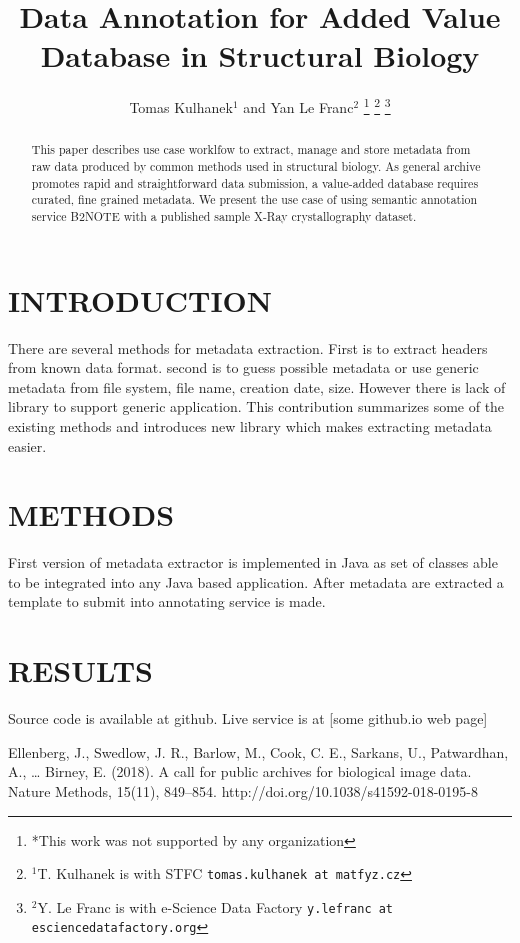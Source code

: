 \documentclass[letterpaper, 10 pt, conference]{ieeeconf}  %
\title{\LARGE \bf
Data Annotation for Added Value Database in Structural Biology 
}
\author{Tomas Kulhanek$^{1}$ and Yan Le Franc$^{2}$%
\thanks{*This work was not supported by any organization}%
\thanks{$^{1}$T. Kulhanek is with STFC
        {\tt\small tomas.kulhanek at matfyz.cz}}%
\thanks{$^{2}$Y. Le Franc is with e-Science Data Factory
        {\tt\small y.lefranc at esciencedatafactory.org}}%
}
\begin{document}
\maketitle
\thispagestyle{empty}
\pagestyle{empty}


\begin{abstract}

This paper describes use case worklfow to extract, manage and store metadata from raw data produced by common methods used in structural biology. As general archive promotes rapid and straightforward data submission, a value-added database requires curated, fine grained metadata. We present the use case of using semantic annotation service B2NOTE with a published sample X-Ray crystallography dataset.
\end{abstract}


\section{INTRODUCTION}

There are several methods for metadata extraction. First is to extract headers from known data format. second is to guess possible metadata or use generic metadata from file system, file name, creation date, size. However there is lack of library to support generic application.
This contribution summarizes some of the existing methods and introduces new library which makes extracting metadata easier.

\section{METHODS}

First version of metadata extractor is implemented in Java as set of classes able to be integrated into any Java based application. 
After metadata are extracted a template to submit into annotating service is made.

\section{RESULTS}

Source code is available at github. Live service is at [some github.io web page]




\begin{thebibliography}{99}

 Ellenberg, J., Swedlow, J. R., Barlow, M., Cook, C. E., Sarkans, U., Patwardhan, A., … Birney, E. (2018). A call for public archives for biological image data. Nature Methods, 15(11), 849–854. http://doi.org/10.1038/s41592-018-0195-8
\end{thebibliography}
\end{document}
